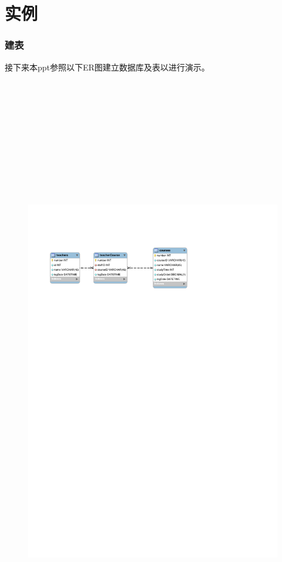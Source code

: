 \documentclass{beamer}
\begin{document}
\section{实例}
\begin{frame}
\frametitle{建表}
接下来本ppt参照以下ER图建立数据库及表以进行演示。
\begin{figure}
\includegraphics[height=27cm]{sql2.pdf}
\end{figure}
\end{frame}
\end{document}
